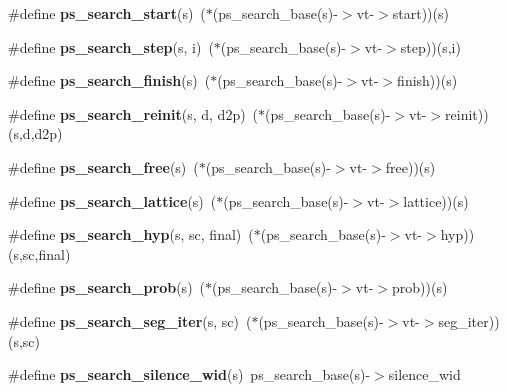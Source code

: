 \begin{DoxyCompactItemize}
\item 
\#define {\bfseries ps\-\_\-search\-\_\-start}(s)~($\ast$(ps\-\_\-search\-\_\-base(s)-\/$>$vt-\/$>$start))(s)\label{pocketsphinx__internal_8h_ac905db8dfa65727e787c44f40d80239c}

\item 
\#define {\bfseries ps\-\_\-search\-\_\-step}(s, i)~($\ast$(ps\-\_\-search\-\_\-base(s)-\/$>$vt-\/$>$step))(s,i)\label{pocketsphinx__internal_8h_a3e3be8540f1e419fe4dfa1a063c4e8be}

\item 
\#define {\bfseries ps\-\_\-search\-\_\-finish}(s)~($\ast$(ps\-\_\-search\-\_\-base(s)-\/$>$vt-\/$>$finish))(s)\label{pocketsphinx__internal_8h_a52d4cf988efa2211c86a2168de346032}

\item 
\#define {\bfseries ps\-\_\-search\-\_\-reinit}(s, d, d2p)~($\ast$(ps\-\_\-search\-\_\-base(s)-\/$>$vt-\/$>$reinit))(s,d,d2p)\label{pocketsphinx__internal_8h_a071483ece6369091cc50334f5be1124b}

\item 
\#define {\bfseries ps\-\_\-search\-\_\-free}(s)~($\ast$(ps\-\_\-search\-\_\-base(s)-\/$>$vt-\/$>$free))(s)\label{pocketsphinx__internal_8h_ac5475853d99524bb4c933c42df58118b}

\item 
\#define {\bfseries ps\-\_\-search\-\_\-lattice}(s)~($\ast$(ps\-\_\-search\-\_\-base(s)-\/$>$vt-\/$>$lattice))(s)\label{pocketsphinx__internal_8h_ac821fb65e0c2ef778a4b8b49ecf30e11}

\item 
\#define {\bfseries ps\-\_\-search\-\_\-hyp}(s, sc, final)~($\ast$(ps\-\_\-search\-\_\-base(s)-\/$>$vt-\/$>$hyp))(s,sc,final)\label{pocketsphinx__internal_8h_a61247136ccf60cf65c19ecc9efebcb73}

\item 
\#define {\bfseries ps\-\_\-search\-\_\-prob}(s)~($\ast$(ps\-\_\-search\-\_\-base(s)-\/$>$vt-\/$>$prob))(s)\label{pocketsphinx__internal_8h_a3fb9e1a2036effd2f15cd088140c750f}

\item 
\#define {\bfseries ps\-\_\-search\-\_\-seg\-\_\-iter}(s, sc)~($\ast$(ps\-\_\-search\-\_\-base(s)-\/$>$vt-\/$>$seg\-\_\-iter))(s,sc)\label{pocketsphinx__internal_8h_a6478039ec1ab5948ff19123c4464a5a4}

\item 
\#define {\bfseries ps\-\_\-search\-\_\-silence\-\_\-wid}(s)~ps\-\_\-search\-\_\-base(s)-\/$>$silence\-\_\-wid\label{pocketsphinx__internal_8h_aab989bd93fe7abcc165bc92d6ccc1bac}


\end{DoxyCompactItemize}
